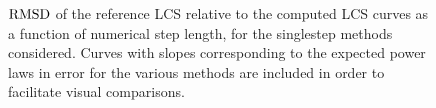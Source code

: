 \begin{figure}[htpb]
    \centering
        
    \caption[$\rmsd$ of the reference LCS relative to the computed LCS curves
    as a function of numerical step length, for the singlestep methods
    considered]
        {$\rmsd$ of the reference LCS relative to the computed LCS curves as a
        function of numerical step length, for the singlestep methods
        considered. Curves with slopes corresponding to the expected power laws
        in error for the various methods are included in order to facilitate
        visual comparisons.}
    \label{fig:lcs_rmsd_fn_nn_fixed}
\end{figure}

